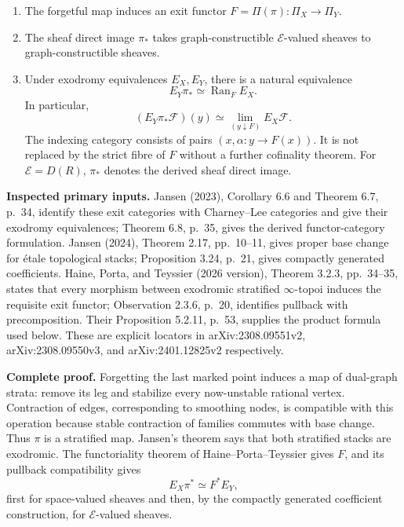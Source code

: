 \documentclass[11pt,a4paper]{article}
\providecommand{\tightlist}{\setlength{\itemsep}{0pt}\setlength{\parskip}{0pt}}
\theoremstyle{definition}\newtheorem{definition}[theorem]{Definition}
\theoremstyle{remark}\newtheorem{remark}[theorem]{Remark}
\begin{document}
\begin{enumerate}
\def\labelenumi{\arabic{enumi}.}
\tightlist
\item
  The forgetful map induces an exit functor
  \(F=\Pi(\pi):\Pi_X\to\Pi_Y\).
\item
  The sheaf direct image \(\pi_*\) takes graph-constructible
  \(\mathcal E\)-valued sheaves to graph-constructible sheaves.
\item
  Under exodromy equivalences \(E_X,E_Y\), there is a natural
  equivalence \[
  E_Y\pi_*\simeq\operatorname{Ran}_{F}E_X.
  \tag{CC-RES.1}
  \] In particular, \[
  (E_Y\pi_*\mathcal F)(y)\simeq
  \lim_{(y\downarrow F)} E_X\mathcal F.
  \tag{CC-RES.2}
  \] The indexing category consists of pairs \((x,\alpha:y\to F(x))\).
  It is not replaced by the strict fibre of \(F\) without a further
  cofinality theorem. For \(\mathcal E=D(R)\), \(\pi_*\) denotes the
  derived sheaf direct image.
\end{enumerate}

\textbf{Inspected primary inputs.} Jansen (2023), Corollary 6.6 and
Theorem 6.7, p.~34, identify these exit categories with Charney--Lee
categories and give their exodromy equivalences; Theorem 6.8, p.~35,
gives the derived functor-category formulation. Jansen (2024), Theorem
2.17, pp.~10--11, gives proper base change for étale topological stacks;
Proposition 3.24, p.~21, gives compactly generated coefficients. Haine,
Porta, and Teyssier (2026 version), Theorem 3.2.3, pp.~34--35, states
that every morphism between exodromic stratified \(\infty\)-topoi
induces the requisite exit functor; Observation 2.3.6, p.~20, identifies
pullback with precomposition. Their Proposition 5.2.11, p.~53, supplies
the product formula used below. These are explicit locators in
arXiv:2308.09551v2, arXiv:2308.09550v3, and arXiv:2401.12825v2
respectively.

\textbf{Complete proof.} Forgetting the last marked point induces a map
of dual-graph strata: remove its leg and stabilize every now-unstable
rational vertex. Contraction of edges, corresponding to smoothing nodes,
is compatible with this operation because stable contraction of families
commutes with base change. Thus \(\pi\) is a stratified map. Jansen's
theorem says that both stratified stacks are exodromic. The
functoriality theorem of Haine--Porta--Teyssier gives \(F\), and its
pullback compatibility gives \[
E_X\pi^*\simeq F^*E_Y,
\] first for space-valued sheaves and then, by the compactly generated
coefficient construction, for \(\mathcal E\)-valued sheaves.
\end{document}

